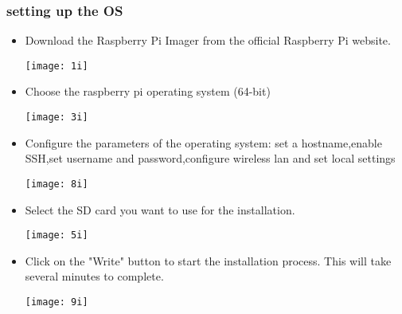 \subsubsection{ setting up the OS }
\begin{itemize}

\item 

\begin{minipage}{0.5\textwidth}
Download the Raspberry Pi Imager from the official Raspberry Pi website.
\end{minipage}
\hfill
\begin{minipage}{0.5\textwidth}
\hspace*{0.3in} \texttt{[image: 1i]}
\end{minipage}
\vspace{0.5in}

\item 
\begin{minipage}{0.5\textwidth}
Choose the raspberry pi operating system (64-bit)
\end{minipage}
\hfill
\begin{minipage}{0.5\textwidth}
\hspace*{0.3in}\texttt{[image: 3i]}
\end{minipage}
\vspace{0.5in}
\item 
\begin{minipage}{0.5\textwidth}
Configure the parameters of the operating system: set a hostname,enable SSH,set username and password,configure wireless lan and set local settings
\end{minipage}
\hfill
\begin{minipage}{0.5\textwidth}
\hspace*{0.3in}\texttt{[image: 8i]}
\end{minipage}
\vspace{0.5in}
\item 
\begin{minipage}{0.5\textwidth}
Select the SD card you want to use for the installation.
\end{minipage}
\hfill
\begin{minipage}{0.5\textwidth}
\hspace*{0.3in}\texttt{[image: 5i]}
\end{minipage}
\vspace{0.5in}
\item 
\begin{minipage}{0.5\textwidth}
Click on the "Write" button to start the installation process. This will take several minutes to complete.
\end{minipage}
\hfill
\begin{minipage}{0.5\textwidth}
\hspace*{0.3in}\texttt{[image: 9i]}
\end{minipage}
\end{itemize}


